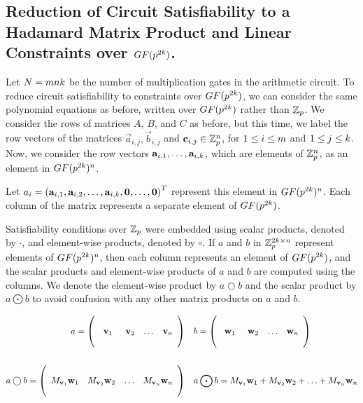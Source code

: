 \subsection{Reduction of Circuit Satisfiability to a Hadamard Matrix Product and Linear Constraints over $GF(p^{2k})$.}
Let $N=m n k$ be the number of multiplication gates in the arithmetic circuit. 
To reduce circuit satisfiability to constraints over $GF(p^{2k})$, we can consider the same polynomial equations as before, written over $GF(p^{2k})$ rather than $\mathbb{Z}_p$. We consider the rows of matrices $A$, $B$, and $C$ as before, but this time, we label the row vectors of the matrices $\vec{a}_{i,j},\vec{b}_{i,j}$ and $\mathbf{c}_{i,j} \in \mathbb{Z}_p^n$, for $1 \leq i \leq m$ and $1 \leq j \leq k$. Now, we consider the row vectors $\mathbf{a}_{i,1},\ldots,\mathbf{a}_{i,k}$, which are elements of $\mathbb{Z}_p^n$, as an element in $GF(p^{2k})^n$.

Let $a_i = \left( \mathbf{a}_{i,1} , \mathbf{a}_{i,2} , \dots , \mathbf{a}_{i,k} , \mathbf{0} , \dots , \mathbf{0}\right)^T$ represent this element in $GF(p^{2k})^n$. Each column of the matrix represents a separate element of $GF(p^{2k})$.

Satisfiability conditions over $\mathbb{Z}_p$ were embedded using scalar products, denoted by $\cdot$, and element-wise products, denoted by $\circ$. If $a$ and $b$ in $\mathbb{Z}_p^{2k \times n}$ represent elements of $GF(p^{2k})^n$, then each column represents an element of $GF(p^{2k})$, and the scalar products and element-wise products of $a$ and $b$ are computed using the columns. We denote the element-wise product by $a \bigcirc b$ and the scalar product by $a \bigodot b$ to avoid confusion with any other matrix products on $a$ and $b$.

\begin{align*}
a = \left(\begin{array}{cccc} \\ \mathbf{v}_1 & \mathbf{v}_2 & \ldots & \mathbf{v}_n \\ \qquad \end{array}\right) &\quad b = \left(\begin{array}{cccc} \\ \mathbf{w}_1 & \mathbf{w}_2 & \ldots & \mathbf{w}_n \\ \qquad \end{array}\right)\\ \\
a \bigcirc b = \left(\begin{array}{cccc} \\ M_{\mathbf{v}_1} \mathbf{w}_1 & M_{\mathbf{v}_2}\mathbf{w}_2 & \ldots & M_{\mathbf{v}_n}\mathbf{w}_n \\ \qquad \end{array}\right) &\quad
a \bigodot b = M_{\mathbf{v}_1} \mathbf{w}_1 + M_{\mathbf{v}_2}\mathbf{w}_2 + \ldots + M_{\mathbf{v}_n}\mathbf{w}_n
\end{align*}

